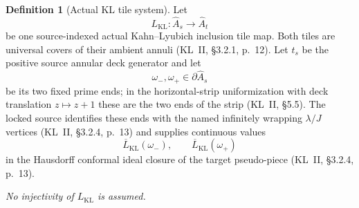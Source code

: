 \documentclass[11pt,reqno]{amsart}
\theoremstyle{definition}
\newtheorem{definition}[theorem]{Definition}
\theoremstyle{remark}
\begin{document}
\begin{definition}[Actual KL tile system]\label{def:kl-tile-system}
Let
\begin{equation}\label{eq:kl-tile-map}
L_{\mathrm{KL}}\colon\widehat A_s\longrightarrow\widehat A_t
\end{equation}
be one source-indexed actual Kahn--Lyubich inclusion tile map.  Both tiles are universal covers of their ambient annuli (KL~II, \S3.2.1, p.~12).  Let \(t_s\) be the positive source annular deck generator and let
\begin{equation}\label{eq:kl-wrapping-ends}
\omega_-,\omega_+\in\partial\widehat A_s
\end{equation}
be its two fixed prime ends; in the horizontal-strip uniformization with deck translation \(z\mapsto z+1\) these are the two ends of the strip (KL~II, \S5.5).  The locked source identifies these ends with the named infinitely wrapping \(\lambda/J\) vertices (KL~II, \S3.2.4, p.~13) and supplies continuous values
\begin{equation}\label{eq:kl-boundary-values}
\overline L_{\mathrm{KL}}(\omega_-),\qquad \overline L_{\mathrm{KL}}(\omega_+)
\end{equation}
in the Hausdorff conformal ideal closure of the target pseudo-piece (KL~II, \S3.2.4, p.~13).

\emph{No injectivity of \(L_{\mathrm{KL}}\) is assumed.}
\end{definition}
\end{document}
